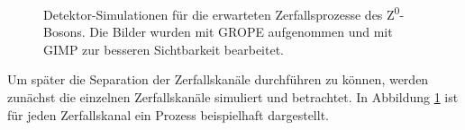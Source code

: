\begin{figure}[h]
	\caption[Detektor-Simulationen für die erwarteten Zerfallsprozesse des Z\textsuperscript0-Bosons]{Detektor-Simulationen für die erwarteten Zerfallsprozesse des Z\textsuperscript0-Bosons. Die Bilder wurden mit GROPE aufgenommen und mit GIMP zur besseren Sichtbarkeit bearbeitet.}
	\label{fig:grope}
\end{figure}
Um später die Separation der Zerfallskanäle durchführen zu können, werden zunächst die einzelnen Zerfallskanäle simuliert und betrachtet. In Abbildung \ref{fig:grope} ist für jeden Zerfallskanal ein Prozess beispielhaft dargestellt.

\begin{figure}[h]
	\centering

\end{figure}
